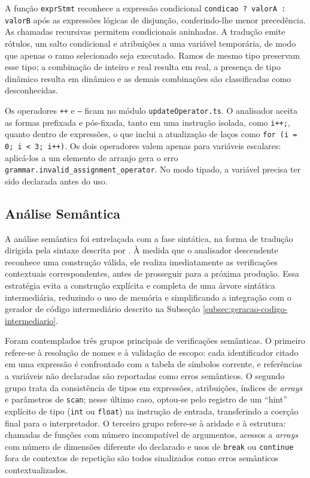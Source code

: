 A função \texttt{exprStmt} reconhece a expressão condicional \texttt{condicao ? valorA : valorB} após as expressões lógicas de disjunção, conferindo-lhe menor precedência. As chamadas recursivas permitem condicionais aninhadas. A tradução emite rótulos, um salto condicional e atribuições a uma variável temporária, de modo que apenas o ramo selecionado seja executado. Ramos de mesmo tipo preservam esse tipo; a combinação de inteiro e real resulta em real, a presença de tipo dinâmico resulta em dinâmico e as demais combinações são classificadas como desconhecidas.

Os operadores \texttt{++} e \texttt{--} ficam no módulo \texttt{updateOperator.ts}. O analisador aceita as formas prefixada e pós-fixada, tanto em uma instrução isolada, como \texttt{i++;}, quanto dentro de expressões, o que inclui a atualização de laços como \texttt{for (i = 0; i < 3; i++)}. Os dois operadores valem apenas para variáveis escalares: aplicá-los a um elemento de arranjo gera o erro \texttt{grammar.\allowbreak{}invalid\_\allowbreak{}assignment\_\allowbreak{}operator}. No modo tipado, a variável precisa ter sido declarada antes do uso.

\subsection{Análise Semântica}
\label{subsec:analise-semantica}

A análise semântica foi entrelaçada com a fase sintática, na forma de tradução dirigida pela sintaxe descrita por . À medida que o analisador descendente reconhece uma construção válida, ele realiza imediatamente as verificações contextuais correspondentes, antes de prosseguir para a próxima produção. Essa estratégia evita a construção explícita e completa de uma árvore sintática intermediária, reduzindo o uso de memória e simplificando a integração com o gerador de código intermediário descrito na Subseção \ref{subsec:geracao-codigo-intermediario}.

Foram contemplados três grupos principais de verificações semânticas. O primeiro refere-se à resolução de nomes e à validação de escopo: cada identificador citado em uma expressão é confrontado com a tabela de símbolos corrente, e referências a variáveis não declaradas são reportadas como erros semânticos. O segundo grupo trata da consistência de tipos em expressões, atribuições, índices de \textit{arrays} e parâmetros de \texttt{scan}; nesse último caso, optou-se pelo registro de um ``hint'' explícito de tipo (\texttt{int} ou \texttt{float}) na instrução de entrada, transferindo a coerção final para o interpretador. O terceiro grupo refere-se à aridade e à estrutura: chamadas de funções com número incompatível de argumentos, acessos a \textit{arrays} com número de dimensões diferente do declarado e usos de \texttt{break} ou \texttt{continue} fora de contextos de repetição são todos sinalizados como erros semânticos contextualizados.

